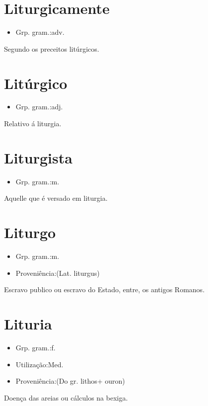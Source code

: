 \section{Liturgicamente}
\begin{itemize}
\item {Grp. gram.:adv.}
\end{itemize}
Segundo os preceitos litúrgicos.
\section{Litúrgico}
\begin{itemize}
\item {Grp. gram.:adj.}
\end{itemize}
Relativo á liturgia.
\section{Liturgista}
\begin{itemize}
\item {Grp. gram.:m.}
\end{itemize}
Aquelle que é versado em liturgia.
\section{Liturgo}
\begin{itemize}
\item {Grp. gram.:m.}
\end{itemize}
\begin{itemize}
\item {Proveniência:(Lat. \textunderscore liturgus\textunderscore )}
\end{itemize}
Escravo publico ou escravo do Estado, entre, os antigos Romanos.
\section{Lituria}
\begin{itemize}
\item {Grp. gram.:f.}
\end{itemize}
\begin{itemize}
\item {Utilização:Med.}
\end{itemize}
\begin{itemize}
\item {Proveniência:(Do gr. \textunderscore lithos\textunderscore  + \textunderscore ouron\textunderscore )}
\end{itemize}
Doença das areias ou cálculos na bexiga.
